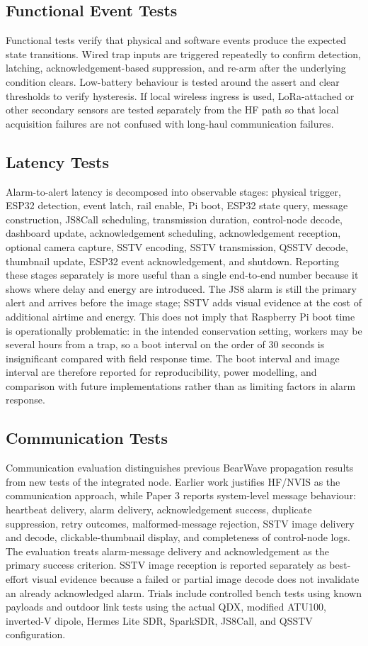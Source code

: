 \documentclass[acmsmall,screen]{acmart}
\begin{document}
\subsection{Functional Event Tests}
Functional tests verify that physical and software events produce the expected state transitions. Wired trap inputs are triggered repeatedly to confirm detection, latching, acknowledgement-based suppression, and re-arm after the underlying condition clears. Low-battery behaviour is tested around the assert and clear thresholds to verify hysteresis. If local wireless ingress is used, LoRa-attached or other secondary sensors are tested separately from the HF path so that local acquisition failures are not confused with long-haul communication failures.

\subsection{Latency Tests}
Alarm-to-alert latency is decomposed into observable stages: physical trigger, ESP32 detection, event latch, rail enable, Pi boot, ESP32 state query, message construction, JS8Call scheduling, transmission duration, control-node decode, dashboard update, acknowledgement scheduling, acknowledgement reception, optional camera capture, SSTV encoding, SSTV transmission, QSSTV decode, thumbnail update, ESP32 event acknowledgement, and shutdown. Reporting these stages separately is more useful than a single end-to-end number because it shows where delay and energy are introduced. The JS8 alarm is still the primary alert and arrives before the image stage; SSTV adds visual evidence at the cost of additional airtime and energy. This does not imply that Raspberry Pi boot time is operationally problematic: in the intended conservation setting, workers may be several hours from a trap, so a boot interval on the order of 30 seconds is insignificant compared with field response time. The boot interval and image interval are therefore reported for reproducibility, power modelling, and comparison with future implementations rather than as limiting factors in alarm response.

\subsection{Communication Tests}
Communication evaluation distinguishes previous BearWave propagation results from new tests of the integrated node. Earlier work justifies HF/NVIS as the communication approach, while Paper 3 reports system-level message behaviour: heartbeat delivery, alarm delivery, acknowledgement success, duplicate suppression, retry outcomes, malformed-message rejection, SSTV image delivery and decode, clickable-thumbnail display, and completeness of control-node logs. The evaluation treats alarm-message delivery and acknowledgement as the primary success criterion. SSTV image reception is reported separately as best-effort visual evidence because a failed or partial image decode does not invalidate an already acknowledged alarm. Trials include controlled bench tests using known payloads and outdoor link tests using the actual QDX, modified ATU100, inverted-V dipole, Hermes Lite SDR, SparkSDR, JS8Call, and QSSTV configuration.
\end{document}
